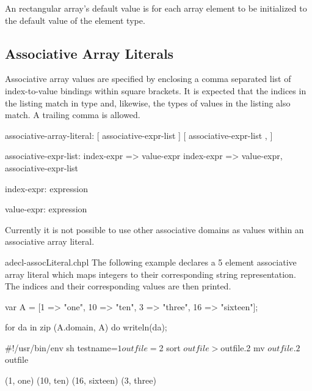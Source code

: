 An rectangular array's default value is for each array element to be initialized to
the default value of the element type.

\subsection{Associative Array Literals}
\label{Associative_Array_Literals}

Associative array values are specified by enclosing a comma separated list of
index-to-value bindings within square brackets. It is expected that the indices 
in the listing match in type and, likewise, the types of values in the listing 
also match. A trailing comma is allowed.

\begin{syntax}
associative-array-literal:
  [ associative-expr-list ]
  [ associative-expr-list , ]

associative-expr-list:
  index-expr => value-expr
  index-expr => value-expr, associative-expr-list

index-expr:
  expression

value-expr:
  expression
\end{syntax}

\begin{openissue}
Currently it is not possible to use other associative domains as values within
an associative array literal.
\end{openissue}

\begin{chapelexample}{adecl-assocLiteral.chpl}
The following example declares a 5 element associative array literal which maps
integers to their corresponding string representation. The indices and their
corresponding values are then printed. 
\begin{chapel}
var A = [1 => "one", 10 => "ten", 3 => "three", 16 => "sixteen"];

for da in zip (A.domain, A) do
  writeln(da);
\end{chapel}
\begin{chapelprediff}
\#!/usr/bin/env sh
testname=$1
outfile=$2
sort $outfile > $outfile.2
mv $outfile.2 $outfile
\end{chapelprediff}
\begin{chapeloutput}
(1, one)
(10, ten)
(16, sixteen)
(3, three)
\end{chapeloutput}
\end{chapelexample}

